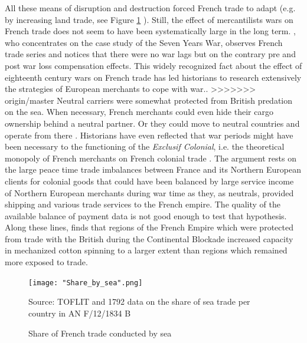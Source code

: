 \documentclass[12pt,a4paper,notitlepage,english]{article}
\newcommand{\source}[1]{\caption*{\footnotesize Source: {#1}} }
\begin{document}
All these means of disruption and destruction forced French trade to adapt (e.g. by increasing land trade, see Figure  \ref{Share_by_sea} ).
Still, the effect of mercantilists wars on French trade does not seem to have been systematically large in the long term.
\cite{Riley1986}, who concentrates on the case study of the Seven Years War, observes French trade series and notices that there were no war lags but on the contrary pre and post war loss compensation effects.
This widely recognized fact about the effect of eighteenth century wars on French trade has led historians to research extensively the strategies of European merchants to cope with war..
>>>>>>> origin/master
Neutral carriers were somewhat protected from British predation on the sea.
When necessary, French merchants could even hide their cargo ownership behind a neutral partner.
Or they could move to neutral countries and operate from there \citep{Marzagalli2016}.
Historians have even reflected that war periods might have been necessary to the functioning of the \textit{Exclusif Colonial}, i.e. the theoretical monopoly of French merchants on French colonial trade \citep{Lespagnol1997, Morineau1997, Marzagalli2016}.
The argument rests on the large peace time trade imbalances between France and its Northern European clients for colonial goods that could have been balanced by large service income of Northern European merchants during war time as they, as neutrals, provided shipping and various trade services to the French empire.
The quality of the available balance of payment data is not good enough to test that hypothesis.
Along these lines, \cite{Juhasz2018} finds that regions of the French Empire which were protected from trade with the British during the Continental Blockade increased capacity in mechanized cotton spinning to a larger extent than regions which remained more exposed to trade.\\


\begin{figure}
	\caption{Share of French trade conducted by sea}
	\centering
	\texttt{[image: "Share\_by\_sea".png]}
	\source{TOFLIT and 1792 data on the share of sea trade per country in AN F/12/1834 B}
	\label{Share_by_sea}
\end{figure}
\end{document}
